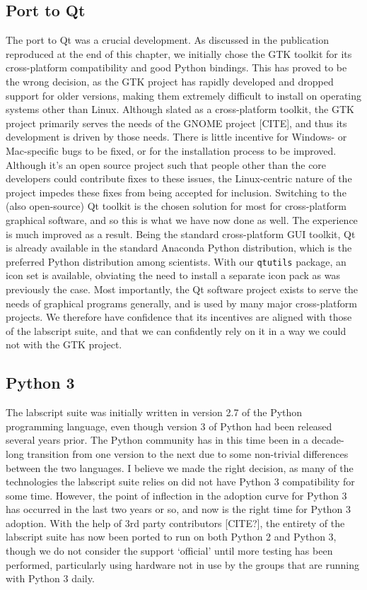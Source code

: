 \subsection{Port to Qt}
The port to Qt was a crucial development. As discussed in the publication reproduced at the end of this chapter, we initially chose the GTK toolkit for its cross-platform compatibility and good Python bindings. This has proved to be the wrong decision, as the GTK project has rapidly developed and dropped support for older versions, making them extremely difficult to install on operating systems other than Linux. Although slated as a cross-platform toolkit, the GTK project primarily serves the needs of the GNOME project [CITE], and thus its development is driven by those needs. There is little incentive for Windows- or Mac-specific bugs to be fixed, or for the installation process to be improved. Although it's an open source project such that people other than the core developers could contribute fixes to these issues, the Linux-centric nature of the project impedes these fixes from being accepted for inclusion. Switching to the (also open-source) Qt toolkit is the chosen solution for most for cross-platform graphical software, and so this is what we have now done as well. The experience is much improved as a result. Being the standard cross-platform GUI toolkit, Qt is already available in the standard Anaconda Python distribution, which is the preferred Python distribution among scientists. With our \texttt{qtutils} package, an icon set is available, obviating the need to install a separate icon pack as was previously the case. Most importantly, the Qt software project exists to serve the needs of graphical programs generally, and is used by many major cross-platform projects. We therefore have confidence that its incentives are aligned with those of the labscript suite, and that we can confidently rely on it in a way we could not with the GTK project.


\subsection{Python 3}

The labscript suite was initially written in version 2.7 of the Python programming language, even though version 3 of Python had been released several years prior. The Python community has in this time been in a decade-long transition from one version to the next due to some non-trivial differences between the two languages. I believe we made the right decision, as many of the technologies the labscript suite relies on did not have Python 3 compatibility for some time. However, the point of inflection in the adoption curve for Python 3 has occurred in the last two years or so, and now is the right time for Python 3 adoption. With the help of 3rd party contributors [CITE?], the entirety of the labscript suite has now been ported to run on both Python 2 and Python 3, though we do not consider the support `official' until more testing has been performed, particularly using hardware not in use by the groups that are running with Python 3 daily.

